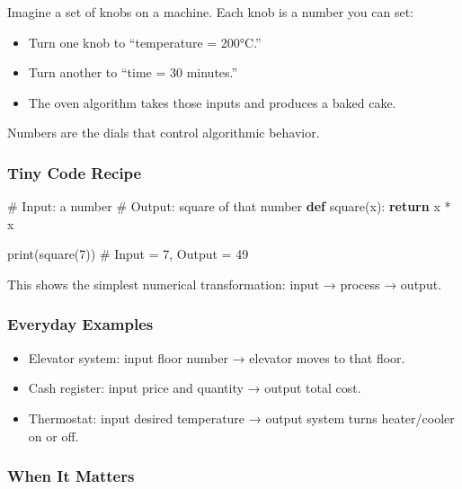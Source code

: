 \documentclass[
  letterpaper,
  DIV=11,
  numbers=noendperiod]{scrreprt}
\newenvironment{Shaded}{\begin{snugshade}}{\end{snugshade}}
\newcommand{\BuiltInTok}[1]{\textcolor[rgb]{0.00,0.23,0.31}{#1}}
\newcommand{\CommentTok}[1]{\textcolor[rgb]{0.37,0.37,0.37}{#1}}
\newcommand{\ControlFlowTok}[1]{\textcolor[rgb]{0.00,0.23,0.31}{\textbf{#1}}}
\newcommand{\DecValTok}[1]{\textcolor[rgb]{0.68,0.00,0.00}{#1}}
\newcommand{\KeywordTok}[1]{\textcolor[rgb]{0.00,0.23,0.31}{\textbf{#1}}}
\newcommand{\NormalTok}[1]{\textcolor[rgb]{0.00,0.23,0.31}{#1}}
\newcommand{\OperatorTok}[1]{\textcolor[rgb]{0.37,0.37,0.37}{#1}}
\providecommand{\tightlist}{%
  \setlength{\itemsep}{0pt}\setlength{\parskip}{0pt}}
\begin{document}
Imagine a set of knobs on a machine. Each knob is a number you can set:

\begin{itemize}
\tightlist
\item
  Turn one knob to ``temperature = 200°C.''
\item
  Turn another to ``time = 30 minutes.''
\item
  The oven algorithm takes those inputs and produces a baked cake.
\end{itemize}

Numbers are the dials that control algorithmic behavior.

\subsubsection{Tiny Code Recipe}\label{tiny-code-recipe-10}

\begin{Shaded}
\begin{Highlighting}[]
\CommentTok{\# Input: a number}
\CommentTok{\# Output: square of that number}
\KeywordTok{def}\NormalTok{ square(x):}
    \ControlFlowTok{return}\NormalTok{ x }\OperatorTok{*}\NormalTok{ x}

\BuiltInTok{print}\NormalTok{(square(}\DecValTok{7}\NormalTok{))   }\CommentTok{\# Input = 7, Output = 49}
\end{Highlighting}
\end{Shaded}

This shows the simplest numerical transformation: input → process →
output.

\subsubsection{Everyday Examples}\label{everyday-examples-10}

\begin{itemize}
\tightlist
\item
  Elevator system: input floor number → elevator moves to that floor.
\item
  Cash register: input price and quantity → output total cost.
\item
  Thermostat: input desired temperature → output system turns
  heater/cooler on or off.
\end{itemize}

\subsubsection{When It Matters}\label{when-it-matters-9}
\end{document}
